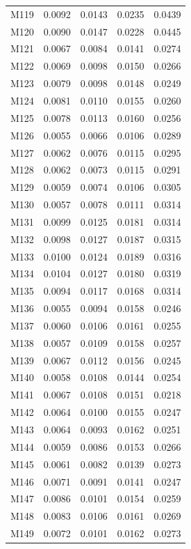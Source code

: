 \begin{longtable}{lrrrr}
M119 & 0.0092 & 0.0143 & 0.0235 & 0.0439 \\
M120 & 0.0090 & 0.0147 & 0.0228 & 0.0445 \\
M121 & 0.0067 & 0.0084 & 0.0141 & 0.0274 \\
M122 & 0.0069 & 0.0098 & 0.0150 & 0.0266 \\
M123 & 0.0079 & 0.0098 & 0.0148 & 0.0249 \\
M124 & 0.0081 & 0.0110 & 0.0155 & 0.0260 \\
M125 & 0.0078 & 0.0113 & 0.0160 & 0.0256 \\
M126 & 0.0055 & 0.0066 & 0.0106 & 0.0289 \\
M127 & 0.0062 & 0.0076 & 0.0115 & 0.0295 \\
M128 & 0.0062 & 0.0073 & 0.0115 & 0.0291 \\
M129 & 0.0059 & 0.0074 & 0.0106 & 0.0305 \\
M130 & 0.0057 & 0.0078 & 0.0111 & 0.0314 \\
M131 & 0.0099 & 0.0125 & 0.0181 & 0.0314 \\
M132 & 0.0098 & 0.0127 & 0.0187 & 0.0315 \\
M133 & 0.0100 & 0.0124 & 0.0189 & 0.0316 \\
M134 & 0.0104 & 0.0127 & 0.0180 & 0.0319 \\
M135 & 0.0094 & 0.0117 & 0.0168 & 0.0314 \\
M136 & 0.0055 & 0.0094 & 0.0158 & 0.0246 \\
M137 & 0.0060 & 0.0106 & 0.0161 & 0.0255 \\
M138 & 0.0057 & 0.0109 & 0.0158 & 0.0257 \\
M139 & 0.0067 & 0.0112 & 0.0156 & 0.0245 \\
M140 & 0.0058 & 0.0108 & 0.0144 & 0.0254 \\
M141 & 0.0067 & 0.0108 & 0.0151 & 0.0218 \\
M142 & 0.0064 & 0.0100 & 0.0155 & 0.0247 \\
M143 & 0.0064 & 0.0093 & 0.0162 & 0.0251 \\
M144 & 0.0059 & 0.0086 & 0.0153 & 0.0266 \\
M145 & 0.0061 & 0.0082 & 0.0139 & 0.0273 \\
M146 & 0.0071 & 0.0091 & 0.0141 & 0.0247 \\
M147 & 0.0086 & 0.0101 & 0.0154 & 0.0259 \\
M148 & 0.0083 & 0.0106 & 0.0161 & 0.0269 \\
M149 & 0.0072 & 0.0101 & 0.0162 & 0.0273 \\

\end{longtable}
